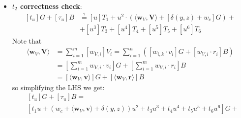 \documentclass[../lecture-notes-148x210.tex]{subfiles}
\begin{document}
\begin{itemize}
\begin{equation*}
\begin{aligned}
            &- \langle \mathbf{y}^n, \mathbf{y}^{-n} \circ \mathbf{H} \rangle + \langle \mathbf{w}_O, \mathbf{y}^{-n} \circ \mathbf{H} \rangle + [\alpha u + \gamma u^2 + \beta u^3]B \\
            &= \textcolor{Violet}{u^3 \cdot \langle \mathbf{s}_L, \mathbf{G} \rangle} + \textcolor{teal}{u^2 \cdot \langle \mathbf{a}_O, \mathbf{G} \rangle} + \textcolor{Sepia}{u \cdot \langle \mathbf{a}_L, \mathbf{G}\rangle + u \cdot \langle \mathbf{y}^{-n} \circ \mathbf{w}_R, \mathbf{G} \rangle} + \\
            &+\textcolor{Violet}{u^3 \cdot \langle \mathbf{s}_R, \mathbf{H} \rangle} + \textcolor{Sepia}{u \cdot \langle \mathbf{a}_R, \mathbf{H} \rangle + u \cdot \langle \mathbf{w}_L, \mathbf{y}^n \circ \mathbf{H} \rangle} \\
            &\textcolor{gray}{- \langle \mathbf{1}^n, \mathbf{H} \rangle + \langle \mathbf{w}_O, \mathbf{y}^{-n} \circ \mathbf{H} \rangle} + \textcolor{RubineRed}{[\alpha u]B + [\gamma u^2]B + [\beta u^3]B}
        \end{aligned}
    \end{equation*}
    As we see, $LHS=RHS$, so the check holds.
    \item \textbf{$t_2$ correctness check}:
    \begin{equation*}
        \begin{aligned}
            [t_u]G + [\tau_u]B &\stackrel{\text{?}}{=} [u]T_1 + u^2 \cdot (\langle \mathbf{w}_V, \mathbf{V} \rangle + [\delta(y,z) + w_c]G) +\\
            &+ [u^3]T_3 + [u^4]T_4 + [u^5]T_5 + [u^6]T_6
        \end{aligned}
    \end{equation*}
    Note that 
    \begin{align*}
        \langle \mathbf{w}_V, \mathbf{V} \rangle &= \sum_{i=1}^m [w_{V,i}]V_i = \sum_{i=1}^n ([w_{i, k} \cdot v_i]G + [w_{V, i} \cdot r_i]B) \\
        &= [\sum_{i=1}^m w_{V, i} \cdot v_i]G + [\sum_{i=1}^m w_{V, i} \cdot r_i]B \\
        &= [\langle \mathbf{w}_V, \mathbf{v} \rangle] G + [\langle \mathbf{w}_V, \mathbf{r} \rangle] B
    \end{align*}
    so simplifying the LHS we get:
    \begin{equation*}
        \begin{aligned}
            &[t_u]G + [\tau_u]B = \\
            & [t_1 u + (w_c + \langle \mathbf{w}_V, \mathbf{v} \rangle + \delta(y, z)) u^2 + t_3 u^3 + t_4 u^4 + t_5 u^5 + t_6 u^6]G + \\

\end{aligned}
\end{equation*}
\end{itemize}
\end{document}
